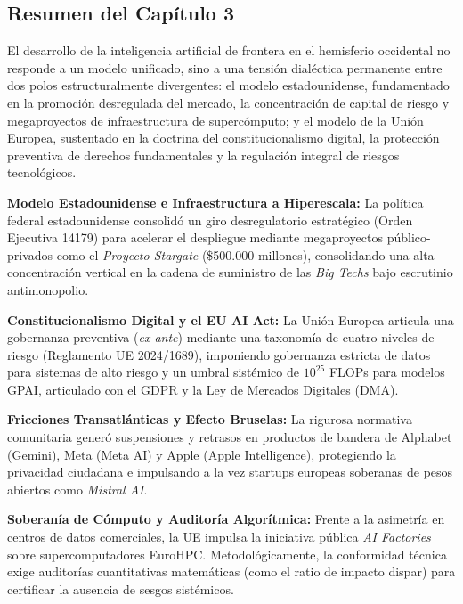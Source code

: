 \subsection*{Resumen del Capítulo 3}

El desarrollo de la inteligencia artificial de frontera en el hemisferio occidental no responde a un modelo unificado, sino a una tensión dialéctica permanente entre dos polos estructuralmente divergentes: el modelo estadounidense, fundamentado en la promoción desregulada del mercado, la concentración de capital de riesgo y megaproyectos de infraestructura de supercómputo; y el modelo de la Unión Europea, sustentado en la doctrina del constitucionalismo digital, la protección preventiva de derechos fundamentales y la regulación integral de riesgos tecnológicos.

\begin{resumenlist}[topsep=0.1cm, itemsep=0.1cm]
    \item \textbf{Modelo Estadounidense e Infraestructura a Hiperescala:} La política federal estadounidense consolidó un giro desregulatorio estratégico (Orden Ejecutiva 14179) para acelerar el despliegue mediante megaproyectos público-privados como el \textit{Proyecto Stargate} (\$500.000 millones), consolidando una alta concentración vertical en la cadena de suministro de las \textit{Big Techs} bajo escrutinio antimonopolio.
    \item \textbf{Constitucionalismo Digital y el EU AI Act:} La Unión Europea articula una gobernanza preventiva (\textit{ex ante}) mediante una taxonomía de cuatro niveles de riesgo (Reglamento UE 2024/1689), imponiendo gobernanza estricta de datos para sistemas de alto riesgo y un umbral sistémico de $10^{25}$ FLOPs para modelos GPAI, articulado con el GDPR y la Ley de Mercados Digitales (DMA).
    \item \textbf{Fricciones Transatlánticas y Efecto Bruselas:} La rigurosa normativa comunitaria generó suspensiones y retrasos en productos de bandera de Alphabet (Gemini), Meta (Meta AI) y Apple (Apple Intelligence), protegiendo la privacidad ciudadana e impulsando a la vez startups europeas soberanas de pesos abiertos como \textit{Mistral AI}.
    \item \textbf{Soberanía de Cómputo y Auditoría Algorítmica:} Frente a la asimetría en centros de datos comerciales, la UE impulsa la iniciativa pública \textit{AI Factories} sobre supercomputadores EuroHPC. Metodológicamente, la conformidad técnica exige auditorías cuantitativas matemáticas (como el ratio de impacto dispar) para certificar la ausencia de sesgos sistémicos.
\end{resumenlist}


